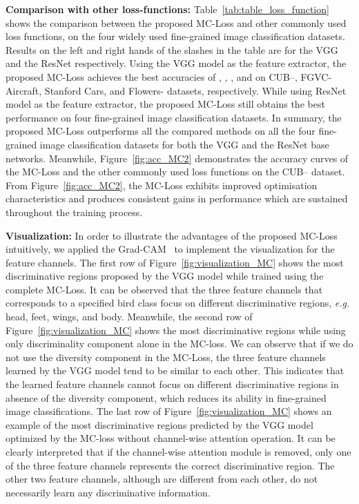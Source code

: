 \documentclass[journal]{IEEEtran}
\begin{document}
\noindent \textbf{Comparison with other loss-functions:} Table~\ref{tab:table_loss_function} shows the comparison between the proposed MC-Loss and other commonly used loss functions, on the  four widely used fine-grained image classification datasets. Results on the left and right hands of the slashes in the table are for the VGG and  the ResNet respectively. Using the VGG model as the feature extractor, the proposed MC-Loss achieves the best accuracies of , , , and  on CUB--, FGVC-Aircraft, Stanford Cars, and Flowers- datasets, respectively. While using ResNet model as the feature extractor, the proposed MC-Loss still obtains the best performance on four fine-grained image classification datasets. In summary, the proposed MC-Loss outperforms all the compared methods on all the four fine-grained image classification datasets for both the VGG and the ResNet base networks. 
{Meanwhile, Figure~\ref{fig:acc_MC2} demonstrates the accuracy curves of the MC-Loss and the  other commonly used loss functions on the CUB-- dataset. 
From  Figure~\ref{fig:acc_MC2}, the MC-Loss exhibits improved optimisation characteristics and produces consistent gains in performance which are sustained throughout the training process.}







\noindent \textbf{Visualization:} In order to illustrate the advantages of the proposed MC-Loss intuitively, we applied the Grad-CAM~\cite{selvaraju2017grad} to implement the visualization for the feature channels. The first row of Figure~\ref{fig:visualization_MC} shows the most discriminative regions proposed by the  VGG model while trained using the complete MC-Loss. It can be observed that the three feature channels that corresponds to a specified bird class focus on different discriminative regions, \emph{e.g.} head, feet, wings, and body. Meanwhile, the second row of Figure~\ref{fig:visualization_MC} shows the most discriminative regions while using only discriminality component alone in the MC-loss. We can observe  that if we do not use the diversity component in the MC-Loss, the three feature channels learned by the VGG  model tend to be similar to each other. This indicates that the learned feature channels cannot focus on different discriminative regions in absence of the diversity component, which reduces its ability in fine-grained image classifications. The last row of Figure~\ref{fig:visualization_MC} shows an example of the most discriminative regions predicted by the VGG model optimized by the MC-loss without channel-wise attention operation. It can be clearly interpreted that if the channel-wise attention module is removed, only one of the three feature channels represents the correct discriminative region. The other two feature channels, although are different from each other, do not necessarily learn any discriminative information. 
\end{document}
